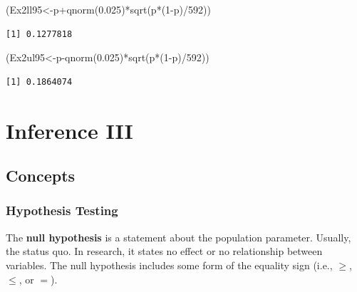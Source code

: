 \documentclass[
  letterpaper,
  DIV=11,
  numbers=noendperiod]{scrreprt}
\newenvironment{Shaded}{\begin{snugshade}}{\end{snugshade}}
\newcommand{\DecValTok}[1]{\textcolor[rgb]{0.68,0.00,0.00}{#1}}
\newcommand{\FloatTok}[1]{\textcolor[rgb]{0.68,0.00,0.00}{#1}}
\newcommand{\FunctionTok}[1]{\textcolor[rgb]{0.28,0.35,0.67}{#1}}
\newcommand{\NormalTok}[1]{\textcolor[rgb]{0.00,0.23,0.31}{#1}}
\newcommand{\OtherTok}[1]{\textcolor[rgb]{0.00,0.23,0.31}{#1}}
\newcommand{\SpecialCharTok}[1]{\textcolor[rgb]{0.37,0.37,0.37}{#1}}
\begin{document}
\begin{Shaded}
\begin{Highlighting}[numbers=left,,]
\NormalTok{(Ex2ll95}\OtherTok{\textless{}{-}}\NormalTok{p}\SpecialCharTok{+}\FunctionTok{qnorm}\NormalTok{(}\FloatTok{0.025}\NormalTok{)}\SpecialCharTok{*}\FunctionTok{sqrt}\NormalTok{(p}\SpecialCharTok{*}\NormalTok{(}\DecValTok{1}\SpecialCharTok{{-}}\NormalTok{p)}\SpecialCharTok{/}\DecValTok{592}\NormalTok{))}
\end{Highlighting}
\end{Shaded}

\begin{verbatim}
[1] 0.1277818
\end{verbatim}

\begin{Shaded}
\begin{Highlighting}[numbers=left,,]
\NormalTok{(Ex2ul95}\OtherTok{\textless{}{-}}\NormalTok{p}\SpecialCharTok{{-}}\FunctionTok{qnorm}\NormalTok{(}\FloatTok{0.025}\NormalTok{)}\SpecialCharTok{*}\FunctionTok{sqrt}\NormalTok{(p}\SpecialCharTok{*}\NormalTok{(}\DecValTok{1}\SpecialCharTok{{-}}\NormalTok{p)}\SpecialCharTok{/}\DecValTok{592}\NormalTok{))}
\end{Highlighting}
\end{Shaded}

\begin{verbatim}
[1] 0.1864074
\end{verbatim}

\hypertarget{inference-iii}{%
\chapter{Inference III}\label{inference-iii}}

\hypertarget{concepts-12}{%
\section{Concepts}\label{concepts-12}}

\hypertarget{hypothesis-testing}{%
\subsection*{Hypothesis Testing}\label{hypothesis-testing}}

The \textbf{null hypothesis} is a statement about the population
parameter. Usually, the status quo. In research, it states no effect or
no relationship between variables. The null hypothesis includes some
form of the equality sign (i.e., \(\geq\), \(\leq\), or \(=\)).
\end{document}
